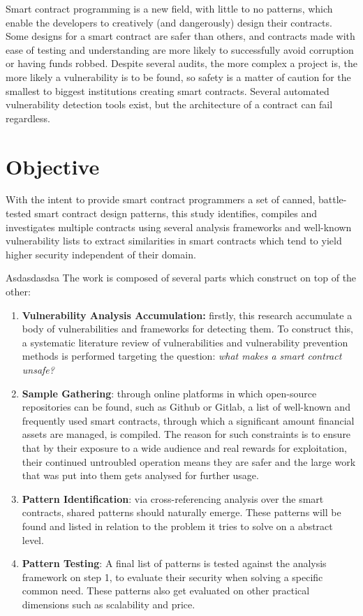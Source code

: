 Smart contract programming is a new field, with little to no patterns, which enable the developers to creatively (and dangerously) design their contracts. Some designs for a smart contract are safer than others, and contracts made with ease of testing and understanding are more likely to successfully avoid corruption or having funds robbed. Despite several audits, the more complex a project is, the more likely a vulnerability is to be found, so safety is a matter of caution for the smallest to biggest institutions creating smart contracts. Several automated vulnerability detection tools exist, but the architecture of a contract can fail regardless.

\section{Objective}

With the intent to provide smart contract programmers a set of canned, battle-tested smart contract design patterns, this study identifies, compiles and investigates multiple contracts using several analysis frameworks and well-known vulnerability lists to extract similarities in smart contracts which tend to yield higher security independent of their domain.


Asdasdasdsa
The work is composed of several parts which construct on top of the other:

\begin{enumerate}
\item \textbf{Vulnerability Analysis Accumulation:} firstly, this research accumulate a body of vulnerabilities and frameworks for detecting them. To construct this, a systematic literature review of vulnerabilities and vulnerability prevention methods is performed targeting the question: \textit{what makes a smart contract unsafe?} 
\item \textbf{Sample Gathering}: through online platforms in which open-source repositories can be found, such as Github or Gitlab, a list of well-known and frequently used smart contracts, through which a significant amount financial assets are managed, is compiled. The reason for such constraints is to ensure that by their exposure to a wide audience and real rewards for exploitation, their continued untroubled operation means they are safer and the large work that was put into them gets analysed for further usage.
\item \textbf{Pattern Identification}: via cross-referencing analysis over the smart contracts, shared patterns should naturally emerge. These patterns will be found and listed in relation to the problem it tries to solve on a abstract level.
\item \textbf{Pattern Testing}: A final list of patterns is tested against the analysis framework on step 1, to evaluate their security when solving a specific common need. These patterns also get evaluated on other practical dimensions such as scalability and price.
\end{enumerate}

